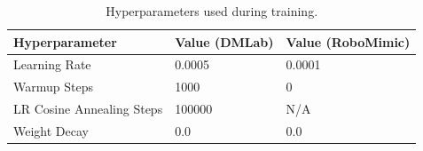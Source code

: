 \begin{table}[!htbp]
\caption{Hyperparameters used during training.}
\vspace{0.1in}
\centering
\begin{tabular}{@{}lll@{}}
\toprule
\textbf{Hyperparameter}   & \textbf{Value (DMLab)} & \textbf{Value (RoboMimic)} \\ \midrule
Learning Rate             & 0.0005                 & 0.0001                     \\
Warmup Steps              & 1000                   & 0                          \\
LR Cosine Annealing Steps & 100000                 & N/A                        \\
Weight Decay              & 0.0                    & 0.0                        \\
\bottomrule                       
\end{tabular}
\label{supp:table:train_hyperparams}
\end{table}